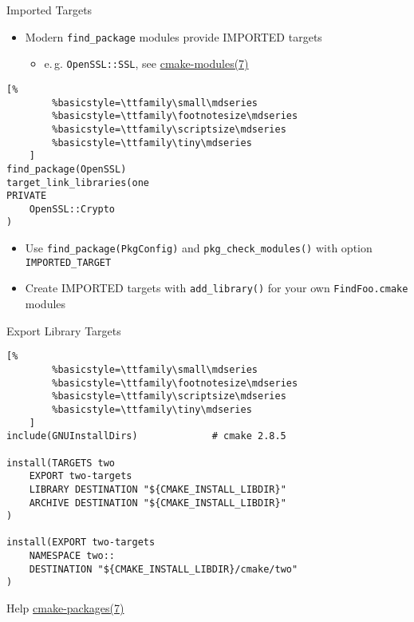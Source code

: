\documentclass[t]{beamer}
\begin{document}
\begin{frame}[fragile]{Imported Targets}
    \begin{itemize}
        \item Modern \texttt{find\_package} modules provide
            IMPORTED targets
            \begin{itemize}
                \item e.\,g. \texttt{OpenSSL::SSL}, see
                    \href{https://cmake.org/cmake/help/latest/manual/cmake-modules.7.html}{cmake-modules(7)}
            \end{itemize}
    \end{itemize}

    \begin{lstlisting}[%
        %basicstyle=\ttfamily\small\mdseries
        %basicstyle=\ttfamily\footnotesize\mdseries
        %basicstyle=\ttfamily\scriptsize\mdseries
        %basicstyle=\ttfamily\tiny\mdseries
    ]
find_package(OpenSSL)
target_link_libraries(one
PRIVATE
    OpenSSL::Crypto
)
    \end{lstlisting}

    \begin{itemize}
        \item Use \texttt{find\_package(PkgConfig)} and
            \texttt{pkg\_check\_modules()} with option
            \texttt{IMPORTED\_TARGET}
        \item Create IMPORTED targets with \texttt{add\_library()}
            for your own \texttt{FindFoo.cmake} modules
    \end{itemize}
\end{frame}

\begin{frame}[fragile]{Export Library Targets}
    \begin{lstlisting}[%
        %basicstyle=\ttfamily\small\mdseries
        %basicstyle=\ttfamily\footnotesize\mdseries
        %basicstyle=\ttfamily\scriptsize\mdseries
        %basicstyle=\ttfamily\tiny\mdseries
    ]
include(GNUInstallDirs)				# cmake 2.8.5

install(TARGETS two
	EXPORT two-targets
	LIBRARY DESTINATION "${CMAKE_INSTALL_LIBDIR}"
	ARCHIVE DESTINATION "${CMAKE_INSTALL_LIBDIR}"
)

install(EXPORT two-targets
	NAMESPACE two::
	DESTINATION "${CMAKE_INSTALL_LIBDIR}/cmake/two"
)
    \end{lstlisting}

    \begin{block}{Help}
        \href{https://cmake.org/cmake/help/latest/manual/cmake-packages.7.html}{cmake-packages(7)}
    \end{block}
\end{frame}
\end{document}
